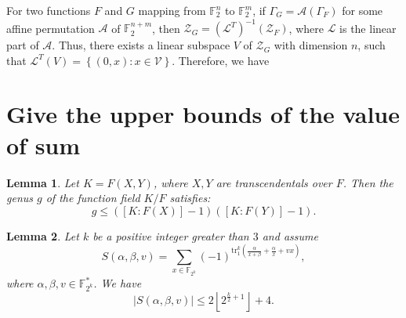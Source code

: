 \documentclass[8pt,oneside]{article}
\newcommand{\0}{\textbf{0}}
\newcommand{\1}{\textbf{1}}
\newcommand{\tr}{\mathrm{tr}_1^k}
\newcommand{\F}{\mathbb{F}}
\newtheorem{lemma}{Lemma}
\begin{document}
    For two functions $ F $ and $ G $ mapping from $ \F_2^n $ to $ \F_2^m $, 
    if $ \Gamma_G=\mathcal{A}(\Gamma_F) $ for some affine permutation $ \mathcal{A} $ of $ \F_2^{n+m} $, 
    then $ \mathcal{Z}_G=(\mathcal{L}^T)^{-1}(\mathcal{Z}_F) $, where $ \mathcal{L} $ is the linear part of $ \mathcal{A} $. 
    Thus, there exists a linear subspace $ V $ of $ \mathcal{Z}_G $ with dimension $ n $, 
    such that $ \mathcal{L}^T(V)=\left\{ (0,x):x\in\mathcal{V} \right\} $. 
    Therefore, we have 
    
\section{Give the upper bounds of the value of sum}

    \begin{lemma}\label{L:genus_K_F}\cite{Stichtenoth2008book_algebraicfunctionfieldsandcodes}
        Let $ K=F(X,Y) $, where $ X,Y $ are transcendentals over $ F $. 
        Then the genus $ g $ of the function field $ K/F $ satisfies: 
        \[g\le ([K : F(X)] - 1)([K : F(Y)] - 1).\]
    \end{lemma}
    \begin{lemma}
        Let $ k $ be a positive integer greater than $ 3 $ and assume 
        \[S(\alpha,\beta,v)=\sum_{x\in\F_{2^k}}(-1)^{\tr\left( \frac{\alpha}{x+\beta}+\frac{\alpha}{x}+vx \right)},\]
        where $ \alpha,\beta,v\in\F_{2^k}^* $. We have 
        \[\left\lvert S(\alpha,\beta,v)\right\rvert\le 2\left\lfloor 2^{\frac{k}{2}+1}\right\rfloor+4 .\]
    \end{lemma}
\end{document}
